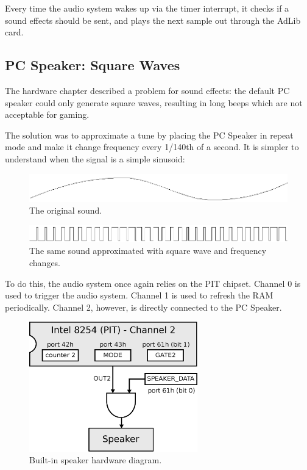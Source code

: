 \documentclass[book.tex]{subfiles}
\begin{document}
Every time the audio system wakes up via the timer interrupt, it checks if a sound effects should be sent, and plays the next sample out through the AdLib card.\\

\subsection{PC Speaker: Square Waves}
The hardware chapter described a problem for sound effects: the default PC speaker could only generate square waves, resulting in long beeps which are not acceptable for gaming.\\
\par
The solution was to approximate a tune by placing the PC Speaker in repeat mode and make it change frequency every 1/140th of a second. It is simpler to understand when the signal is a simple sinusoid:
\pagebreak
\begin{figure}[H]
\centering
 \includegraphics[width=\textwidth]{imgs/drawings/pwm/sinuois.png}
 \caption{The original sound.}
 \end{figure}
\par

\par
\begin{figure}[H]
\centering
 \includegraphics[width=\textwidth]{imgs/drawings/pwm/pwm_approximation.png}
 \caption{The same sound approximated with square wave and frequency changes.}
 \end{figure}
\par

To do this, the audio system once again relies on the PIT chipset. Channel 0 is used to trigger the audio system. Channel 1 is used to refresh the RAM periodically. Channel 2, however, is directly connected to the PC Speaker. \\
\par
\begin{figure}[H]
  \centering
  \includegraphics[width=0.65\textwidth]{imgs/drawings/pc_speaker.eps}
  \caption{Built-in speaker hardware diagram.}
  \label{fig:pc_speaker}
\end{figure}
\par
\end{document}
